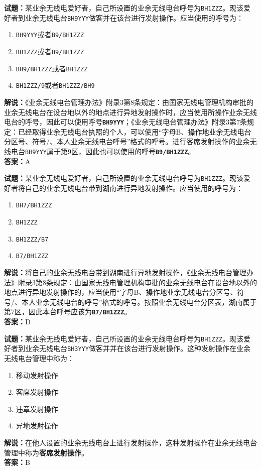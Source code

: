\documentclass{ctexbook}
\begin{document}
\bigskip


\noindent\textbf{试题：}某业余无线电爱好者，自己所设置的业余无线电台呼号为\texttt{BH1ZZZ}。现该爱好者到业余无线电台\texttt{BH9YYY}做客并在该台进行发射操作。应当使用的呼号为：
\begin{enumerate}[leftmargin=3em]
	\item \texttt{BH9YYY}或者\texttt{B9/BH1ZZZ}
	\item \texttt{BH1ZZZ}或者\texttt{B9/BH1ZZZ}
	\item \texttt{BH9/BH1ZZZ}或者\texttt{BH1ZZZ}
	\item \texttt{BH1ZZZ/9}或者\texttt{BH1ZZZ/BH9}
\end{enumerate}
\noindent\textbf{解说：}《业余无线电台管理办法》附录3第8条规定：由国家无线电管理机构审批的业余无线电台在设台地以外的地点进行异地发射操作时，应当使用所操作业余无线电台的呼号，因此可以使用呼号\texttt{\textbf{BH9YYY}}；《业余无线电台管理办法》附录3第7条规定：已经取得业余无线电台执照的个人，可以使用“字母B、操作地业余无线电台分区号、符号/、本人业余无线电台呼号”格式的呼号。进行客席发射操作的业余无线电台\texttt{BH9YYY}属于第9区，因此也可以使用的呼号\texttt{\textbf{B9/BH1ZZZ}}。\\\noindent\textbf{答案：}A


\bigskip


\noindent\textbf{试题：}某业余无线电爱好者，自己所设置的业余无线电台呼号为\texttt{BH1ZZZ}。现该爱好者将自己的业余无线电台带到湖南进行异地发射操作。应当使用的呼号为：
\begin{enumerate}[leftmargin=3em]
	\item \texttt{BH7/BH1ZZZ}
	\item \texttt{BH1ZZZ}
	\item \texttt{BH1ZZZ/B7}
	\item \texttt{B7/BH1ZZZ}
\end{enumerate}
\noindent\textbf{解说：}将自己的业余无线电台带到湖南进行异地发射操作，《业余无线电台管理办法》附录3第8条规定：由国家无线电管理机构审批的业余无线电台在设台地以外的地点进行异地发射操作的，应当使用“字母B、操作地业余无线电台分区号、符号/、本人业余无线电台的呼号”格式的呼号。按照业余无线电台分区表，湖南属于第7区，因此本台呼号应该为\texttt{\textbf{B7/BH1ZZZ}}。\\\noindent\textbf{答案：}D



\bigskip


\noindent\textbf{试题：}某业余无线电爱好者，自己所设置的业余无线电台呼号为\texttt{BH1ZZZ}。现该爱好者到业余无线电台\texttt{BH3YYY}做客并并在该台进行发射操作。这种发射操作在业余无线电台管理中称为：
\begin{enumerate}[leftmargin=3em]
	\item 移动发射操作
	\item 客席发射操作
	\item 违章发射操作
	\item 异地发射操作
\end{enumerate}
\noindent\textbf{解说：}在他人设置的业余无线电台上进行发射操作，这种发射操作在业余无线电台管理中称为\textbf{客席发射操作}。\\
\noindent\textbf{答案：}B
\end{document}

